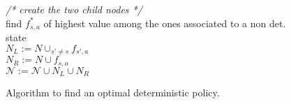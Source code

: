 \begin{figure}[h!]
{{ \hspace*{3ex} \hspace*{3ex} \hspace*{3ex} {\em {\footnotesize /* create the two child nodes */}}\\
 \hspace*{3ex} \hspace*{3ex} \hspace*{3ex} find $f^*_{s,a}$ of highest value among the ones associated to a non det. state \\
 \hspace*{3ex} \hspace*{3ex} \hspace*{3ex} $N_L := N \cup_{s' \neq s} f_{s',a}$  \\
\hspace*{3ex} \hspace*{3ex} \hspace*{3ex} $N_R := N \cup f_{s,a}$  \\
\hspace*{3ex} \hspace*{3ex} \hspace*{3ex} $\mathcal{N} := \mathcal{N} \cup N_L \cup N_R$\\
}}
\caption{Algorithm to find an optimal deterministic policy.} \label{fig:basic_bb}
\end{figure}


